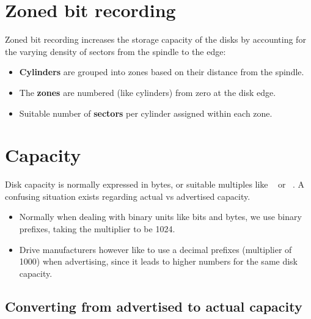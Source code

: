 \documentclass[slides]{pgnotes}
\begin{document}
\section{Zoned bit recording}
\label{sec:zoned-bit-recording}

Zoned bit recording increases the storage capacity of the disks by
accounting for the varying density of sectors from the spindle to the
edge:

\begin{minipage}{0.69\linewidth}
\begin{itemize}
\item
  \textbf{Cylinders} are grouped into zones based on their distance from the
  spindle.
\item
  The \textbf{zones} are numbered (like cylinders) from zero at the disk edge.
\item
  Suitable number of \textbf{sectors} per cylinder assigned within each zone.
\end{itemize}
\end{minipage}
\begin{minipage}{0.3\linewidth}
\end{minipage}

\section{Capacity}
\label{sec:magnetic-disk-capacity}

Disk capacity is normally expressed in bytes, or suitable multiples like \si{\giga\byte}
or \si{\tera\byte}. A confusing situation exists regarding actual vs advertised
capacity.

\begin{itemize}
\item
  Normally when dealing with binary units like bits and bytes, we use
  binary prefixes, taking the multiplier to be 1024.
\item
  Drive manufacturers however like to use a decimal prefixes (multiplier
  of 1000) when advertising, since it leads to higher numbers for the
  same disk capacity.
\end{itemize}

\subsection{Converting from advertised to actual capacity}
\label{sec:converting-from-advertised-to-actual-capacity}
\end{document}
